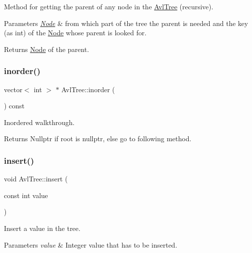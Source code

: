 Method for getting the parent of any node in the \mbox{\hyperlink{class_avl_tree}{Avl\+Tree}} (recursive). 
\begin{DoxyParams}{Parameters}
{\em \mbox{\hyperlink{struct_avl_tree_1_1_node}{Node}}} & from which part of the tree the parent is needed and the key (as int) of the \mbox{\hyperlink{struct_avl_tree_1_1_node}{Node}} whose parent is looked for. \\
\hline
\end{DoxyParams}
\begin{DoxyReturn}{Returns}
\mbox{\hyperlink{struct_avl_tree_1_1_node}{Node}} of the parent. 
\end{DoxyReturn}
\mbox{\label{class_avl_tree_a5e48b6ecedf5fb5dfad0b5db9aa32254}} 
\subsubsection{\texorpdfstring{inorder()}{inorder()}}
{\footnotesize\ttfamily vector$<$ int $>$ $\ast$ Avl\+Tree\+::inorder (\begin{DoxyParamCaption}{ }\end{DoxyParamCaption}) const}

Inordered walkthrough. \begin{DoxyReturn}{Returns}
Nullptr if root is nullptr, else go to following method. 
\end{DoxyReturn}
\mbox{\label{class_avl_tree_acf5a845217dd1d6c060951c78eb4b3c0}} 
\subsubsection{\texorpdfstring{insert()}{insert()}\hspace{0.1cm}{\footnotesize\ttfamily [1/2]}}
{\footnotesize\ttfamily void Avl\+Tree\+::insert (\begin{DoxyParamCaption}\item[{const int}]{value }\end{DoxyParamCaption})}

Insert a value in the tree. 
\begin{DoxyParams}{Parameters}
{\em value} & Integer value that has to be inserted. \\
\hline
\end{DoxyParams}
\mbox{\label{class_avl_tree_a5749646180a1cb2ec36c2830be294205}} 
